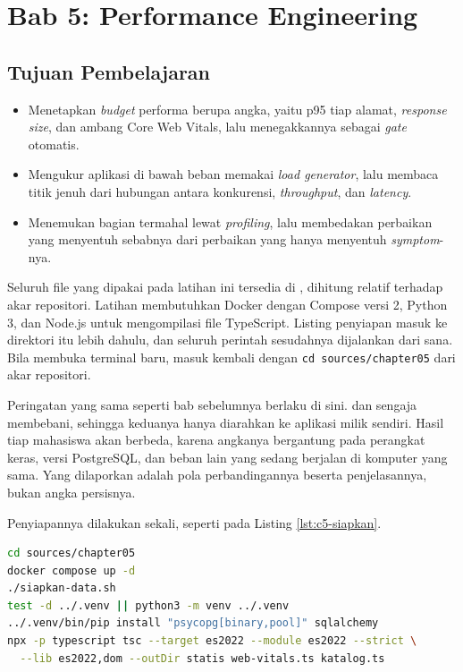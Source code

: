 \section{Bab 5: Performance Engineering}

\subsection*{Tujuan Pembelajaran}
\begin{itemize}
  \item Menetapkan \textit{budget} performa berupa angka, yaitu p95 tiap alamat,
        \textit{response size}, dan ambang Core Web Vitals, lalu menegakkannya sebagai
        \textit{gate} otomatis.
  \item Mengukur aplikasi di bawah beban memakai \textit{load generator},
        lalu membaca titik jenuh dari hubungan antara konkurensi,
        \textit{throughput}, dan \textit{latency}.
  \item Menemukan bagian termahal lewat \textit{profiling}, lalu membedakan
        perbaikan yang menyentuh sebabnya dari perbaikan yang hanya menyentuh
        \textit{symptom}-nya.
\end{itemize}

Seluruh file yang dipakai pada latihan ini tersedia di
, dihitung relatif terhadap akar repositori.
Latihan membutuhkan Docker dengan Compose versi 2, Python 3, dan Node.js
untuk mengompilasi file TypeScript. Listing penyiapan masuk ke direktori
itu lebih dahulu, dan seluruh perintah sesudahnya dijalankan dari sana. Bila
membuka terminal baru, masuk kembali dengan \texttt{cd sources/chapter05}
dari akar repositori.

Peringatan yang sama seperti bab sebelumnya berlaku di sini.
 dan
 sengaja membebani, sehingga
keduanya hanya diarahkan ke aplikasi milik sendiri. Hasil tiap mahasiswa akan
berbeda, karena angkanya bergantung pada perangkat keras, versi PostgreSQL,
dan beban lain yang sedang berjalan di komputer yang sama. Yang dilaporkan
adalah pola perbandingannya beserta penjelasannya, bukan angka persisnya.

Penyiapannya dilakukan sekali, seperti pada Listing \ref{lst:c5-siapkan}.

\begin{lstlisting}[language=bash, caption={Menyiapkan basis data, data uji, dan file statis, memakai \berkas{sources/chapter05/siapkan-data.sh}}, label={lst:c5-siapkan}]
cd sources/chapter05
docker compose up -d
./siapkan-data.sh
test -d ../.venv || python3 -m venv ../.venv
../.venv/bin/pip install "psycopg[binary,pool]" sqlalchemy
npx -p typescript tsc --target es2022 --module es2022 --strict \
  --lib es2022,dom --outDir statis web-vitals.ts katalog.ts
\end{lstlisting}

